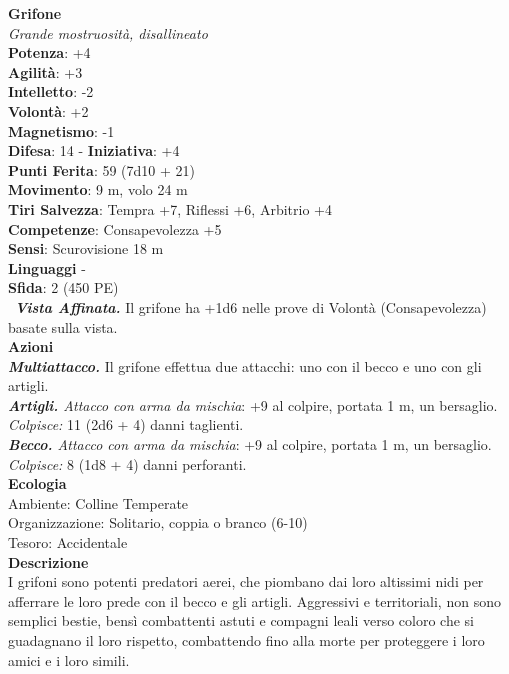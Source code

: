 \begin{multicols}{2}
\medskip\textbf{Grifone}\\
\emph{Grande mostruosità, disallineato}\\
\textbf{Potenza}: +4\\
\textbf{Agilità}: +3\\
\textbf{Intelletto}: -2\\
\textbf{Volontà}: +2\\
\textbf{Magnetismo}: -1\\
\textbf{Difesa}: 14 - \textbf{Iniziativa}: +4\\
\textbf{Punti Ferita}: 59 (7d10 + 21)\\
\textbf{Movimento}: 9 m, volo 24 m\\
\textbf{Tiri Salvezza}: Tempra +7, Riflessi +6, Arbitrio +4\\
\textbf{Competenze}: Consapevolezza +5\\
\textbf{Sensi}: Scurovisione 18 m\\
\textbf{Linguaggi} -\\
\textbf{Sfida}: 2 (450 PE)\smallskip\\\
\emph{\textbf{Vista Affinata.}} Il grifone ha +1d6 nelle prove di Volontà (Consapevolezza) basate sulla vista.\\
\smallskip\textbf{Azioni}\\
\emph{\textbf{Multiattacco.}} Il grifone effettua due attacchi: uno con il becco e uno con gli artigli.\\
\emph{\textbf{Artigli.} Attacco con arma da mischia}: +9 al colpire, portata 1 m, un bersaglio.\\
\emph{Colpisce:} 11 (2d6 + 4) danni taglienti.\\
\emph{\textbf{Becco.} Attacco con arma da mischia}: +9 al colpire, portata 1 m, un bersaglio.\\
\emph{Colpisce:} 8 (1d8 + 4) danni perforanti.\\
\textbf{Ecologia}\\
Ambiente: Colline Temperate\\
Organizzazione: Solitario, coppia o branco (6-10)\\
Tesoro: Accidentale\\
\textbf{Descrizione}\\
I grifoni sono potenti predatori aerei, che piombano dai loro altissimi nidi per afferrare le loro prede con il becco e gli artigli. Aggressivi e territoriali, non sono semplici bestie, bensì combattenti astuti e compagni leali verso coloro che si guadagnano il loro rispetto, combattendo fino alla morte per proteggere i loro amici e i loro simili.\\


\end{multicols}

